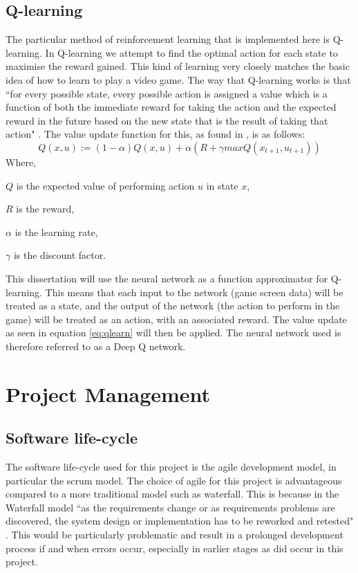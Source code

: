 \documentclass[10pt]{article}
\begin{document}
		\subsection{Q-learning}
		The particular method of reinforcement learning that is implemented here is Q-learning. In Q-learning we attempt to find the optimal action for each state to maximise the reward gained. This kind of learning very closely matches the basic idea of how to learn to play a video game. The way that Q-learning works is that ``for every possible state, every possible action is assigned a value which is a function of both the immediate reward for taking the action and the expected reward in the future based on the new state that is the result of taking that action" \cite{qlearning}. The value update function for this, as found in \cite{qlearning}, is as follows:
		\begin{equation}\label{eq:qlearn}
			Q(x,u) := (1 - \alpha)Q(x,u) + \alpha(R + \gamma maxQ(x_{t+1},u_{t+1}))
		\end{equation}				
		Where, 
		\begin{list}{•}{•}
			\item $Q$ is the expected value of performing action $u$ in state $x$,
			\item $R$ is the reward,
			\item $\alpha$ is the learning rate,
			\item $\gamma$ is the discount factor.
		\end{list}
		This dissertation will use the neural network as a function approximator for Q-learning. This means that each input to the network (game screen data) will be treated as a state, and the output of the network (the action to perform in the game) will be treated as an action, with an associated reward. The value update as seen in equation \ref{eq:qlearn} will then be applied. The neural network used is therefore referred to as a Deep Q network.
		
		\bigskip
	
\section{Project Management}
	\subsection{Software life-cycle}
		The software life-cycle used for this project is the agile development model, in particular the scrum model. The choice of agile for this project is advantageous compared to a more traditional model such as waterfall. This is because in the Waterfall model ``as the requirements change or as requirements problems are discovered, the system design or implementation has to be reworked and retested" \cite{swengi}. This would be particularly problematic and result in a prolonged development process if and when errors occur, especially in earlier stages as did occur in this project.\\
		
\end{document}
